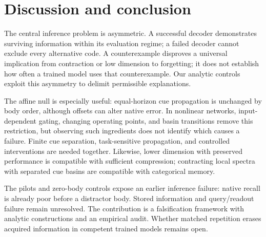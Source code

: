 \section{Discussion and conclusion}
\label{sec:discussion}

The central inference problem is asymmetric. A successful decoder demonstrates surviving information within its evaluation regime; a failed decoder cannot exclude every alternative code. A counterexample disproves a universal implication from contraction or low dimension to forgetting; it does not establish how often a trained model uses that counterexample. Our analytic controls exploit this asymmetry to delimit permissible explanations.

The affine null is especially useful: equal-horizon cue propagation is unchanged by body order, although offsets can alter native error. In nonlinear networks, input-dependent gating, changing operating points, and basin transitions remove this restriction, but observing such ingredients does not identify which causes a failure. Finite cue separation, task-sensitive propagation, and controlled interventions are needed together. Likewise, lower dimension with preserved performance is compatible with sufficient compression; contracting local spectra with separated cue basins are compatible with categorical memory.

The pilots and zero-body controls expose an earlier inference failure: native recall is already poor before a distractor body. Stored information and query/readout failure remain unresolved. The contribution is a falsification framework with analytic constructions and an empirical audit. Whether matched repetition erases acquired information in competent trained models remains open.
